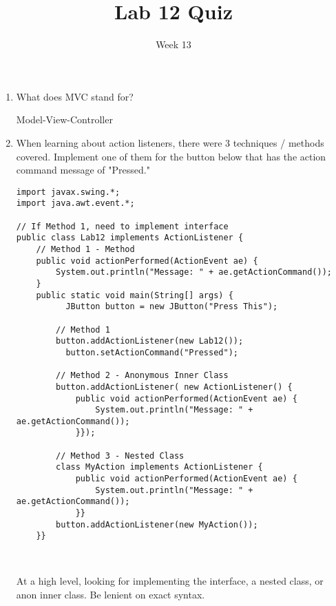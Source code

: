 \documentclass[12pt]{article}
\title{Lab 12 Quiz}
\date{Week 13}
\begin{document}
 

\Instructions

\begin{enumerate}

\item {} 
What does MVC stand for?

\Ans Model-View-Controller


\item {} When learning about action listeners, there were 3 techniques / methods covered. Implement one of them for the button below that has the action command message of "Pressed."

\begin{lstlisting}
import javax.swing.*;
import java.awt.event.*;

// If Method 1, need to implement interface
public class Lab12 implements ActionListener {
    // Method 1 - Method
    public void actionPerformed(ActionEvent ae) {
		System.out.println("Message: " + ae.getActionCommand());
	}
    public static void main(String[] args) {
		  JButton button = new JButton("Press This");	
        
        // Method 1
        button.addActionListener(new Lab12());
		  button.setActionCommand("Pressed");

        // Method 2 - Anonymous Inner Class
        button.addActionListener( new ActionListener() {
			public void actionPerformed(ActionEvent ae) {
				System.out.println("Message: " + ae.getActionCommand());
			}});
		
		// Method 3 - Nested Class
		class MyAction implements ActionListener {
	        public void actionPerformed(ActionEvent ae) { 
	            System.out.println("Message: " + ae.getActionCommand());
	        }}
	    button.addActionListener(new MyAction());
    }}
	    
	
\end{lstlisting}
\Ans At a high level, looking for implementing the interface, a nested class, or anon inner class. Be lenient on exact syntax.


\clearpage
\ifdraft \clearpage \fi

\end{enumerate}   
\end{document}
